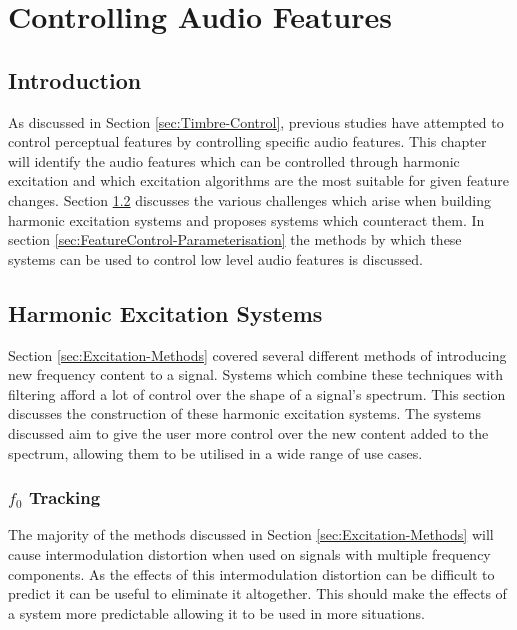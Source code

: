 
\chapter{Controlling Audio Features} %
\label{chap:FeatureControl}

\section{Introduction}
\label{sec:FeatureControl-Introduction}
	As discussed in Section \ref{sec:Timbre-Control}, previous studies have attempted to control perceptual features by
	controlling specific audio features. This chapter will identify the audio features which can be controlled through
	harmonic excitation and which excitation algorithms are the most suitable for given feature changes. Section
	\ref{sec:FeatureControl-Systems} discusses the various challenges which arise when building harmonic excitation
	systems and proposes systems which counteract them. In section \ref{sec:FeatureControl-Parameterisation} the
	methods by which these systems can be used to control low level audio features is discussed.

\section{Harmonic Excitation Systems}
\label{sec:FeatureControl-Systems}
	Section \ref{sec:Excitation-Methods} covered several different methods of introducing new frequency content to a
	signal. Systems which combine these techniques with filtering afford a lot of control over the shape of a signal's
	spectrum. This section discusses the construction of these harmonic excitation systems. The systems discussed aim
	to give the user more control over the new content added to the spectrum, allowing them to be utilised in a wide
	range of use cases.

	\subsection{$f_{0}$ Tracking}
	\label{sec:FeatureControl-Systems-Fundamental}
		The majority of the methods discussed in Section \ref{sec:Excitation-Methods} will cause intermodulation
		distortion when used on signals with multiple frequency components. As the effects of this intermodulation
		distortion can be difficult to predict it can be useful to eliminate it altogether. This should make the
		effects of a system more predictable allowing it to be used in more situations.


